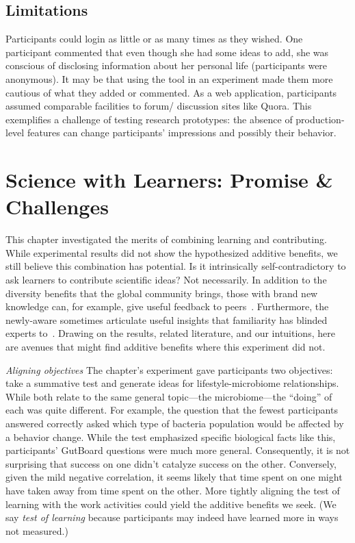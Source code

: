 \subsection*{Limitations}
Participants could login as little or as many times as they wished. One participant commented that even though she had some ideas to add, she was conscious of disclosing information about her personal life (participants were anonymous). It may be that using the tool in an experiment made them more cautious of what they added or commented.
As a web application, participants assumed comparable facilities to forum/ discussion sites like Quora. This exemplifies a challenge of testing research prototypes: the absence of production-level features can change participants’ impressions and possibly their behavior.

\section{Science with Learners: Promise \& Challenges}
This chapter investigated the merits of combining learning and contributing. While experimental results did not show the hypothesized additive benefits, we still believe this combination has potential. Is it intrinsically self-contradictory to ask learners to contribute scientific ideas? Not necessarily. In addition to the diversity benefits that the global community brings, those with brand new knowledge can, for example, give useful feedback to peers~\cite{Kulkarni2013peer}. Furthermore, the newly-aware sometimes articulate useful insights that familiarity has blinded experts to~\cite{Hinds1999}. Drawing on the results, related literature, and our intuitions, here are avenues that might find additive benefits where this experiment did not.

\textit{Aligning objectives}
The chapter’s experiment gave participants two objectives: take a summative test and generate ideas for lifestyle-microbiome relationships. While both relate to the same general topic---the microbiome---the “doing” of each was quite different. For example, the question that the fewest participants answered correctly asked which type of bacteria population would be affected by a behavior change. While the test emphasized specific biological facts like this, participants’ GutBoard questions were much more general. Consequently, it is not surprising that success on one didn’t catalyze success on the other. Conversely, given the mild negative correlation, it seems likely that time spent on one might have taken away from time spent on the other. More tightly aligning the test of learning with the work activities could yield the additive benefits we seek. (We say \textit{test of learning} because participants may indeed have learned more in ways not measured.) 

